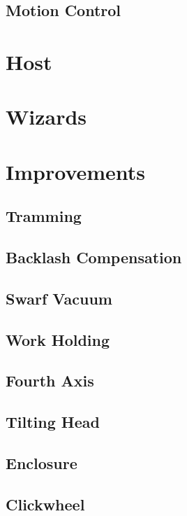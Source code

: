 \documentclass[a4paper,11pt]{article}
\begin{document}
\subsection{Motion Control}

\section{Host}
\section{Wizards}

\section{Improvements}
\subsection{Tramming}
\subsection{Backlash Compensation}
\subsection{Swarf Vacuum}
\subsection{Work Holding}
\subsection{Fourth Axis}
\subsection{Tilting Head}
\subsection{Enclosure}
\subsection{Clickwheel}
\end{document}
